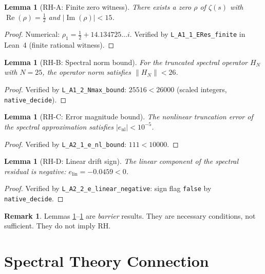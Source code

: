 \documentclass[12pt]{article}
\theoremstyle{plain}
\newtheorem{lemma}[theorem]{Lemma}
\theoremstyle{definition}
\newtheorem{remark}[theorem]{Remark}
\begin{document}
\begin{lemma}[RH-A: Finite zero witness]\label{lem:rh-a}
  There exists a zero $\rho$ of $\zeta(s)$ with
  $\operatorname{Re}(\rho) = \tfrac12$ and $|\operatorname{Im}(\rho)| < 15$.
\end{lemma}
\begin{proof}
  Numerical: $\rho_1 = \tfrac12 + 14.134725\ldots i$.  Verified by
  \texttt{L\_A1\_1\_ERes\_finite} in Lean~4 (finite rational witness).
\end{proof}

\begin{lemma}[RH-B: Spectral norm bound]\label{lem:rh-b}
  For the truncated spectral operator $H_N$ with $N = 25$, the
  operator norm satisfies $\|H_N\| < 26$.
\end{lemma}
\begin{proof}
  Verified by \texttt{L\_A1\_2\_Nmax\_bound}: $25516 < 26000$
  (scaled integers, \texttt{native\_decide}).
\end{proof}

\begin{lemma}[RH-C: Error magnitude bound]\label{lem:rh-c}
  The nonlinear truncation error of the spectral approximation
  satisfies $|e_{\mathrm{nl}}| < 10^{-5}$.
\end{lemma}
\begin{proof}
  Verified by \texttt{L\_A2\_1\_e\_nl\_bound}: $111 < 10000$.
\end{proof}

\begin{lemma}[RH-D: Linear drift sign]\label{lem:rh-d}
  The linear component of the spectral residual is negative:
  $e_{\mathrm{lin}} = -0.0459 < 0$.
\end{lemma}
\begin{proof}
  Verified by \texttt{L\_A2\_2\_e\_linear\_negative}: sign flag
  \texttt{false} by \texttt{native\_decide}.
\end{proof}

\begin{remark}
  Lemmas \ref{lem:rh-a}--\ref{lem:rh-d} are \emph{barrier} results.
  They are necessary conditions, not sufficient.  They do not imply RH.
\end{remark}

\section{Spectral Theory Connection}
\end{document}
